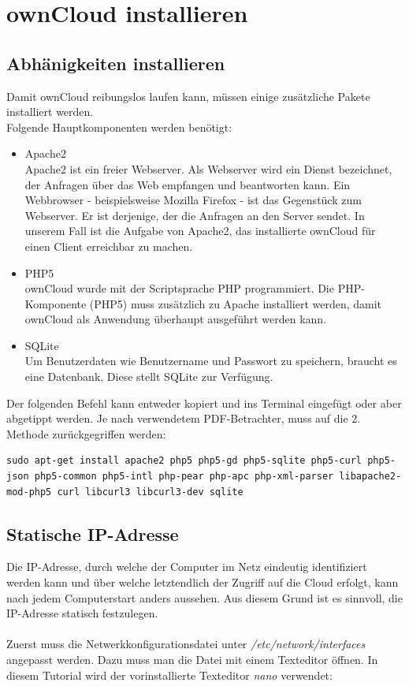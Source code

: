 \section{ownCloud installieren}

\subsection{Abhänigkeiten installieren}
Damit ownCloud reibungslos laufen kann, müssen einige zusätzliche Pakete installiert werden.
\\
Folgende Hauptkomponenten werden benötigt:

\begin{itemize}
\item Apache2 \\
Apache2 ist ein freier Webserver. Als Webserver wird ein Dienst bezeichnet, der Anfragen über das Web empfangen und beantworten kann. Ein Webbrowser - beispielsweise Mozilla Firefox - ist das Gegenstück zum Webserver. Er ist derjenige, der die Anfragen an den Server sendet. In unserem Fall ist die Aufgabe von Apache2, das installierte ownCloud für einen Client erreichbar zu machen.
\item PHP5 \\
ownCloud wurde mit der Scriptsprache PHP programmiert. Die PHP-Komponente (PHP5) muss zusätzlich zu Apache installiert werden, damit ownCloud als Anwendung überhaupt ausgeführt werden kann.
\item SQLite \\
Um Benutzerdaten wie Benutzername und Passwort zu speichern, braucht es eine Datenbank. Diese stellt SQLite zur Verfügung.
\end{itemize}

Der folgenden Befehl kann entweder kopiert und ins Terminal eingefügt oder aber abgetippt werden. Je nach verwendetem PDF-Betrachter, muss auf die 2. Methode zurückgegriffen werden:

\begin{lstlisting}
sudo apt-get install apache2 php5 php5-gd php5-sqlite php5-curl php5-json php5-common php5-intl php-pear php-apc php-xml-parser libapache2-mod-php5 curl libcurl3 libcurl3-dev sqlite
\end{lstlisting}

\subsection{Statische IP-Adresse}
Die IP-Adresse, durch welche der Computer im Netz eindeutig identifiziert werden kann und über welche letztendlich der Zugriff auf die Cloud erfolgt, kann nach jedem Computerstart anders aussehen.
Aus diesem Grund ist es sinnvoll, die IP-Adresse statisch festzulegen.
\\
\\
Zuerst muss die Netwerkkonfigurationsdatei unter \textit{/etc/network/interfaces} angepasst werden. Dazu muss man die Datei mit einem Texteditor öffnen. In diesem Tutorial wird der vorinstallierte Texteditor \textit{nano} verwendet: 

